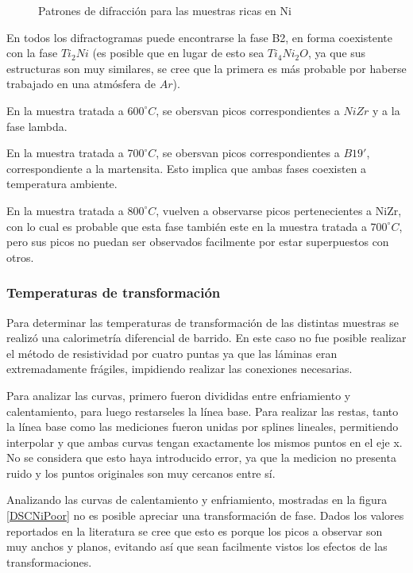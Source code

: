 \documentclass{article}
\theoremstyle{definition}
\theoremstyle{remark}
\begin{document}
\begin{figure}[h]
\caption{Patrones de difracción para las muestras ricas en Ni}
\label{RXNiPoor}
\end{figure}


En todos los difractogramas puede encontrarse la fase B2, en forma coexistente con la fase $Ti_2Ni$ (es posible que en lugar de esto sea $Ti_4Ni_2O$, ya que sus estructuras son muy similares, se cree que la primera es más probable por haberse trabajado en una atmósfera de $Ar$).

En la muestra tratada a $600 ^\circ C$, se obersvan picos correspondientes a $NiZr$ y a la fase lambda.

En la muestra tratada a $700 ^\circ C$, se obersvan picos correspondientes a $B19'$, correspondiente a la martensita. Esto implica que ambas fases coexisten a temperatura ambiente.

En la muestra tratada a $800 ^\circ C$, vuelven a observarse picos pertenecientes a NiZr, con lo cual es probable que esta fase también este en la muestra tratada a $700 ^\circ C$, pero sus picos no puedan ser observados facilmente por estar superpuestos con otros.

\subsubsection{Temperaturas de transformación}
Para determinar las temperaturas de transformación de las distintas muestras se realizó una calorimetría diferencial de barrido. En este caso no fue posible realizar el método de resistividad por cuatro puntas ya que las láminas eran extremadamente frágiles, impidiendo realizar las conexiones necesarias.

Para analizar las curvas, primero fueron divididas entre enfriamiento y calentamiento, para luego restarseles la línea base. Para realizar las restas, tanto la línea base como las mediciones fueron unidas por splines lineales, permitiendo interpolar y que ambas curvas tengan exactamente los mismos puntos en el eje x. No se considera que esto haya introducido error, ya que la medicion no presenta ruido y los puntos originales son muy cercanos entre sí.

Analizando las curvas de calentamiento y enfriamiento, mostradas en la figura \ref{DSCNiPoor} no es posible apreciar una transformación de fase. Dados los valores reportados en la literatura  se cree que esto es porque los picos a observar son muy anchos y planos, evitando así que sean facilmente vistos los efectos de las transformaciones.
\end{document}
